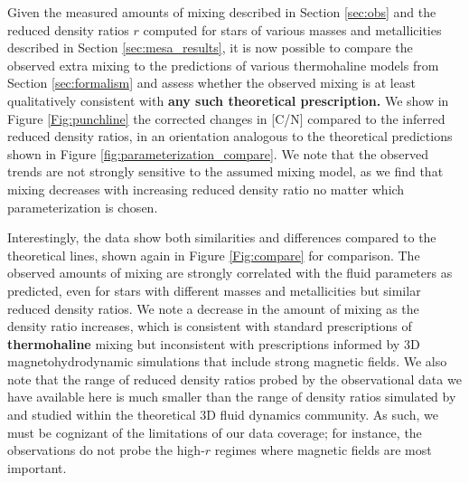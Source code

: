 

Given the measured amounts of mixing described in Section \ref{sec:obs} and the reduced density ratios $r$ computed for stars of various masses and metallicities described in Section \ref{sec:mesa_results}, it is now possible to compare the observed %
extra mixing to the predictions of various thermohaline models from Section \ref{sec:formalism} and assess whether the observed mixing is at least qualitatively consistent with \textbf{any such theoretical prescription.}
%
We show in Figure \ref{Fig:punchline} the corrected changes in [C/N] compared to the inferred reduced density ratios, in an orientation analogous to the theoretical predictions shown in Figure \ref{fig:parameterization_compare}. We note that the observed trends are not strongly sensitive to the assumed mixing model, {as we find that mixing decreases with increasing reduced density ratio} no matter which parameterization is chosen. 


Interestingly, the data show both similarities and differences compared to the theoretical lines, shown again in Figure \ref{Fig:compare} for comparison. The observed amounts of mixing are strongly correlated with the fluid parameters as predicted, even for stars with different masses and metallicities but similar reduced density ratios. %
We note a decrease in the amount of mixing as the density ratio increases, which is %
consistent with standard prescriptions of \textbf{thermohaline} mixing but inconsistent with prescriptions informed by 3D magnetohydrodynamic %
simulations that include strong magnetic fields. We also note that the range of reduced density ratios probed by the observational data we have available here is much smaller than the range of density ratios simulated by and studied within the theoretical 3D fluid dynamics community. As such, we must be cognizant of the limitations of our data coverage; for instance, the observations do not probe the high-$r$ regimes where magnetic fields are most important. %

